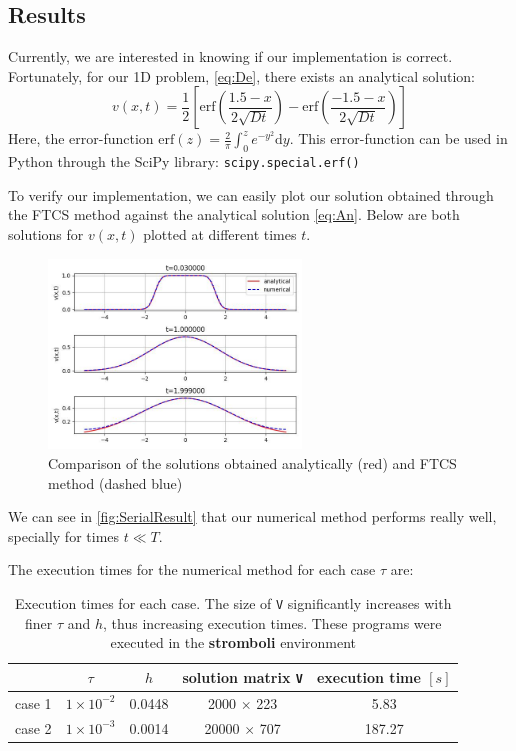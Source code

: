 \subsection{Results}
\label{subsec:results}
Currently, we are interested in knowing if our implementation is correct. Fortunately, for our 1D problem, \autoref{eq:De}, there exists an analytical solution:
\begin{equation}
    v(x,t) = \dfrac{1}{2}\left[ \text{erf}\left( \dfrac{1.5 - x}{2\sqrt{Dt}} \right) - \text{erf}\left( \dfrac{-1.5 - x}{2\sqrt{Dt}} \right) \right] 
    \label{eq:An}
\end{equation}
Here, the error-function $\text{erf}(z) = \frac{2}{\pi}\int_{0}^{z}e^{-y^2} \text{d}y$. This error-function can be used in Python through the SciPy library: \texttt{scipy.special.erf()}

To verify our implementation, we can easily plot our solution obtained through the FTCS method against the analytical solution \autoref{eq:An}. Below are both solutions for $v(x,t)$ plotted at different times $t$.

\begin{figure}[H]
    \centering
    \includegraphics[width=0.6\textwidth]{figures/serial_plot.jpg}
    \caption{Comparison of the solutions obtained analytically (red) and FTCS method (dashed blue)}
    \label{fig:SerialResult}
\end{figure}

We can see in \autoref{fig:SerialResult} that our numerical method performs really well, specially for times $t \ll T$.

The execution times for the numerical method for each case $\tau$ are:
\begin{table}[H]
    \centering
\begin{tabular}{|c|c|c|c|c|}
    \hline
    & $\tau$ & $h$ &  solution matrix \texttt{V} & execution time $[s]$ \\
    \hline
    case 1 & $1\times10^{-2}$ & 0.0448 & 2000 $\times$ 223 & 5.83 \\
    case 2& $1\times10^{-3}$ & 0.0014 & 20000 $\times$ 707 & 187.27 \\
    \hline
\end{tabular}
\caption{Execution times for each case. The size of \texttt{V} significantly increases with finer $\tau$ and $h$, thus increasing execution times. These programs were executed in the \textbf{stromboli} environment}
\end{table}


